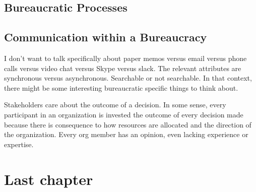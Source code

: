 \documentclass{book}
\begin{document}
  \section{Bureaucratic Processes\label{sec:process}}
    
    
    
    
    
    
    
    
    
  \newpage
  \section{Communication within a Bureaucracy}
  I don't want to talk specifically about paper memos versus email versus phone calls versus video chat versus Skype versus slack. 
The relevant attributes are synchronous versus asynchronous. Searchable or not searchable. In that context, there might be some interesting bureaucratic specific things to think about.
    
    
    
    
    

    Stakeholders care about the outcome of a decision. 
    In some sense, every participant in an organization is invested the outcome of every decision made because there is consequence to how resources are allocated and the direction of the organization. Every org member has an opinion, even lacking experience or expertise. 
    
    
    
%    
%    
    
    
%    
%    

\chapter{Last chapter}

\end{document}
